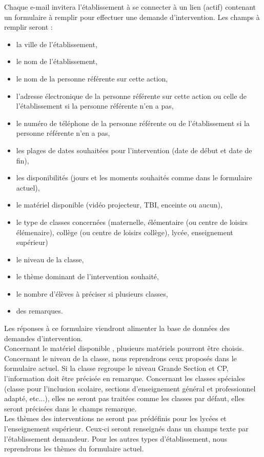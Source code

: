 Chaque e-mail invitera l'établissement à se connecter à un lien (actif) contenant un formulaire à remplir pour effectuer une demande d'intervention. Les champs à remplir seront : 
\begin{itemize}
\item la ville de l'établissement, 
\item le nom de l'établissement, 
\item le nom de la personne référente sur cette action, 
\item l'adresse électronique de la personne référente sur cette action ou celle de l'établissement si la personne  référente n'en a pas, 
\item le numéro de téléphone de la personne référente ou de l'établissement si la personne référente n'en a pas,
\item les plages de dates souhaitées pour l'intervention (date de début et date de fin),
\item les disponibilités (jours et les moments souhaités comme dans le formulaire actuel), 
\item le matériel disponible (vidéo projecteur, TBI, enceinte ou  aucun), 
\item le type de classes concernées (maternelle, élémentaire (ou centre de loisirs élémenaire), collège (ou centre de loisirs collège), lycée, enseignement supérieur)
\item le niveau de la classe, 
\item le thème dominant de l'intervention souhaité, 
\item le nombre d'élèves à préciser si plusieurs classes,
\item des remarques.
\end{itemize}
Les réponses à ce formulaire viendront alimenter la base de données des demandes d'intervention. \\
Concernant le matériel disponible , plusieurs matériels pourront être choisis. \\
Concernant le niveau de la classe, nous reprendrons ceux proposés dans le formulaire actuel. Si la classe regroupe le niveau Grande Section et CP, l'information doit être précisée en remarque.
Concernant les classes spéciales (classe pour l'inclusion scolaire, sections d'enseignement général et professionnel adapté, etc...), elles ne seront pas traitées comme les classes par défaut, elles seront précisées dans le champs remarque.
\\
Les thèmes des interventions ne seront pas prédéfinis pour les lycées et l'enseignement supérieur. Ceux-ci seront renseignés dans un champs texte par l'établissement demandeur. Pour les autres types d'établissement, nous reprendrons les thèmes du formulaire actuel.


